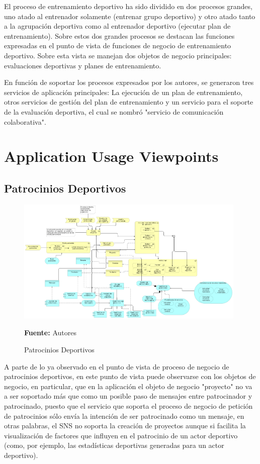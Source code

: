 El proceso de entrenamiento deportivo ha sido dividido en dos procesos grandes, uno atado al entrenador solamente (entrenar grupo deportivo) y otro atado tanto a la agrupación deportiva como al entrenador deportivo (ejecutar plan de entrenamiento). Sobre estos dos grandes procesos se destacan las funciones expresadas en el punto de vista de funciones de negocio de entrenamiento deportivo. Sobre esta vista se manejan dos objetos de negocio principales: evaluaciones deportivas y planes de entrenamiento.

En función de soportar los procesos expresados por los autores, se generaron tres servicios de aplicación principales: La ejecución de un plan de entrenamiento, otros servicios de gestión del plan de entrenamiento y un servicio para el soporte de la evaluación deportiva, el cual se nombró "servicio de comunicación colaborativa".

\section{Application Usage Viewpoints}

\subsection{Patrocinios Deportivos}

\begin{figure}[!htb]
  \begin{center}
    \includegraphics[width=11cm]{./imagenes/application_usage/patrociniosdeportivos.png}
    \caption{Patrocinios Deportivos}
    \label{fig:au_patrocinios_deportivos}
    \textbf{Fuente:}  Autores
  \end{center}
\end{figure}

A parte de lo ya observado en el punto de vista de proceso de negocio de patrocinios deportivos, en este punto de vista puede observarse con los objetos de negocio, en particular, que en la aplicación el objeto de negocio "proyecto" no va a ser soportado más que como un posible paso de mensajes entre patrocinador y patrocinado, puesto que el servicio que soporta el proceso de negocio de petición de patrocinios sólo envía la intención de ser patrocinado como un mensaje, en otras palabras, el SNS no soporta la creación de proyectos aunque si facilita la visualización de factores que influyen en el patrocinio de un actor deportivo (como, por ejemplo, las estadísticas deportivas generadas para un actor deportivo).


